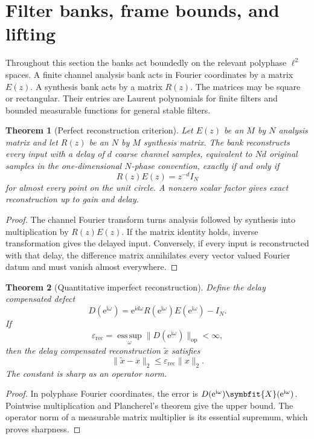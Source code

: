 \documentclass[11pt,letterpaper]{article}
\newtheorem{theorem}{Theorem}[section]
\theoremstyle{plain}
\theoremstyle{plain}
\theoremstyle{plain}
\theoremstyle{definition}
\theoremstyle{definition}
\theoremstyle{definition}
\theoremstyle{definition}
\theoremstyle{remark}
\theoremstyle{remark}
\theoremstyle{remark}
\theoremstyle{remark}
\newcommand{\ii}{\mathrm i}
\newcommand{\esssup}{\operatorname*{ess\,sup}}
\newcommand{\e}{\mathrm e}
\providecommand{\bm}[1]{\symbfit{#1}}
\begin{document}
\section{Filter banks, frame bounds, and lifting}\label{extension:section:05}\label{sec:filter_banks}

Throughout this section the banks act boundedly on the relevant polyphase \(\ell^2\) spaces. A finite channel analysis bank acts in Fourier coordinates by a matrix \(E(z)\). A synthesis bank acts by a matrix \(R(z)\). The matrices may be square or rectangular. Their entries are Laurent polynomials for finite filters and bounded measurable functions for general stable filters.

\begin{theorem}[Perfect reconstruction criterion]\label{thm:perfect_reconstruction}
Let \(E(z)\) be an \(M\) by \(N\) analysis matrix and let \(R(z)\) be an \(N\) by \(M\) synthesis matrix. The bank reconstructs every input with a delay of \(d\) coarse channel samples, equivalent to \(Nd\) original samples in the one-dimensional \(N\)-phase convention, exactly if and only if
\[
R(z)E(z)=z^{-d}I_N
\]
for almost every point on the unit circle. A nonzero scalar factor gives exact reconstruction up to gain and delay.
\end{theorem}

\begin{proof}
The channel Fourier transform turns analysis followed by synthesis into multiplication by \(R(z)E(z)\). If the matrix identity holds, inverse transformation gives the delayed input. Conversely, if every input is reconstructed with that delay, the difference matrix annihilates every vector valued Fourier datum and must vanish almost everywhere.
\end{proof}

\begin{theorem}[Quantitative imperfect reconstruction]\label{thm:imperfect_reconstruction}
Define the delay compensated defect
\[
D(\e^{\ii\omega})
=
\e^{\ii d\omega}R(\e^{\ii\omega})E(\e^{\ii\omega})-I_N.
\]
If
\[
\varepsilon_{\mathrm{rec}}
=
\esssup_{\omega}\|D(\e^{\ii\omega})\|_{\mathrm{op}}<\infty,
\]
then the delay compensated reconstruction \(\widetilde x\) satisfies
\[
\|\widetilde x-x\|_2
\leq
\varepsilon_{\mathrm{rec}}\|x\|_2.
\]
The constant is sharp as an operator norm.
\end{theorem}

\begin{proof}
In polyphase Fourier coordinates, the error is \(D(\e^{\ii\omega})\bm X(\e^{\ii\omega})\). Pointwise multiplication and Plancherel's theorem give the upper bound. The operator norm of a measurable matrix multiplier is its essential supremum, which proves sharpness.
\end{proof}
\end{document}
